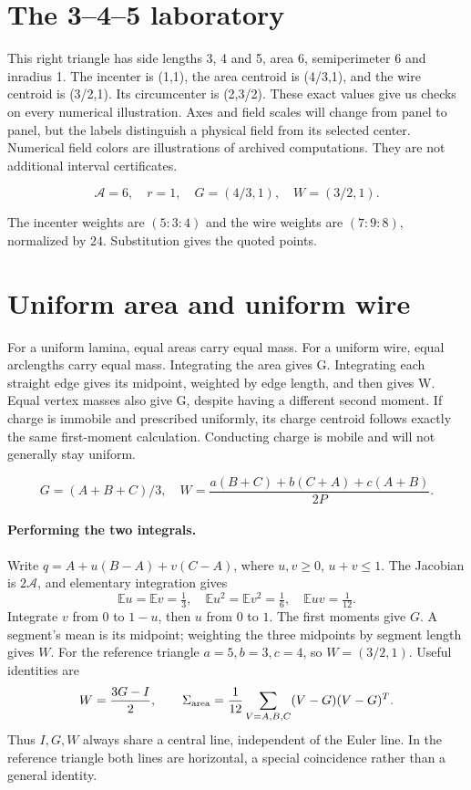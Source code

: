 \documentclass[11pt,oneside,openany]{book}
\begin{document}
\section{The 3--4--5 laboratory}\label{sec:slide8}

This right triangle has side lengths 3, 4 and 5, area 6, semiperimeter 6 and inradius 1. The incenter is (1,1), the area centroid is (4/3,1), and the wire centroid is (3/2,1). Its circumcenter is (2,3/2). These exact values give us checks on every numerical illustration. Axes and field scales will change from panel to panel, but the labels distinguish a physical field from its selected center. Numerical field colors are illustrations of archived computations. They are not additional interval certificates.


\[\mathcal A=6,\quad r=1,\quad G=(4/3,1),\quad W=(3/2,1).\]


The incenter weights are $(5:3:4)$ and the wire weights are
$(7:9:8)$, normalized by $24$. Substitution gives the quoted points.



\section{Uniform area and uniform wire}\label{sec:slide9}

For a uniform lamina, equal areas carry equal mass. For a uniform wire, equal arclengths carry equal mass. Integrating the area gives G. Integrating each straight edge gives its midpoint, weighted by edge length, and then gives W. Equal vertex masses also give G, despite having a different second moment. If charge is immobile and prescribed uniformly, its charge centroid follows exactly the same first-moment calculation. Conducting charge is mobile and will not generally stay uniform.


\[G=(A+B+C)/3,\quad W=\frac{a(B+C)+b(C+A)+c(A+B)}{2P}.\]



\paragraph{Performing the two integrals.}
Write $q=A+u(B-A)+v(C-A)$, where $u,v\ge0$, $u+v\le1$.
The Jacobian is $2\mathcal A$, and elementary integration gives
\[
\mathbb E u=\mathbb E v=\tfrac13,\quad
\mathbb E u^2=\mathbb E v^2=\tfrac16,\quad \mathbb E uv=\tfrac1{12}.
\]
Integrate $v$ from $0$ to $1-u$, then $u$ from $0$ to $1$.
The first moments give $G$. A segment's mean is its midpoint;
weighting the three midpoints by segment length gives $W$.
For the reference triangle $a=5,b=3,c=4$, so $W=(3/2,1)$.
Useful identities are
\[
W=\frac{3G-I}{2},\qquad
\Sigma_{\rm area}=\frac1{12}\sum_{V=A,B,C}(V-G)(V-G)^T.
\]
Thus $I,G,W$ always share a central line, independent of the Euler
line. In the reference triangle both lines are horizontal, a special
coincidence rather than a general identity.
\end{document}
